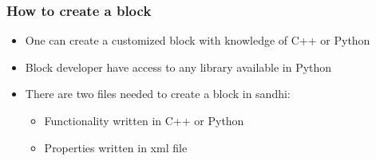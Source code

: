 \documentclass{beamer}
\begin{document}
\begin{frame}
        \frametitle{How to create a block}
        \begin{itemize}
        \item One can create a customized block with knowledge of C++ or Python
        \item Block developer have access to any library available in Python
	\item There are two files needed to create a block in sandhi:
		\begin{itemize}
			\item Functionality written in C++ or Python
			\item Properties written in xml file
		\end{itemize}
        \end{itemize}

\end{frame}
\end{document}
